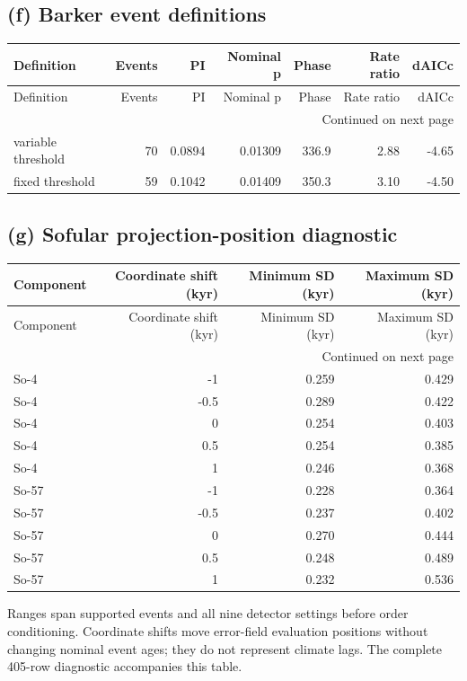\subsection*{(f) Barker event definitions}
{\small
\begin{longtable}{lrrrrrr}
\toprule
Definition & Events & PI & Nominal p & Phase & Rate ratio & dAICc \\
\midrule
\endfirsthead
\toprule
Definition & Events & PI & Nominal p & Phase & Rate ratio & dAICc \\
\midrule
\endhead
\midrule
\multicolumn{7}{r}{Continued on next page} \\
\midrule
\endfoot
\bottomrule
\endlastfoot
variable threshold & 70 & 0.0894 & 0.01309 & 336.9 & 2.88 & -4.65 \\
fixed threshold & 59 & 0.1042 & 0.01409 & 350.3 & 3.10 & -4.50 \\
\end{longtable}
}
\subsection*{(g) Sofular projection-position diagnostic}
{\small
\begin{longtable}{lrrr}
\toprule
Component & Coordinate shift (kyr) & Minimum SD (kyr) & Maximum SD (kyr) \\
\midrule
\endfirsthead
\toprule
Component & Coordinate shift (kyr) & Minimum SD (kyr) & Maximum SD (kyr) \\
\midrule
\endhead
\midrule
\multicolumn{4}{r}{Continued on next page} \\
\midrule
\endfoot
\bottomrule
\endlastfoot
So-4 & -1 & 0.259 & 0.429 \\
So-4 & -0.5 & 0.289 & 0.422 \\
So-4 & 0 & 0.254 & 0.403 \\
So-4 & 0.5 & 0.254 & 0.385 \\
So-4 & 1 & 0.246 & 0.368 \\
So-57 & -1 & 0.228 & 0.364 \\
So-57 & -0.5 & 0.237 & 0.402 \\
So-57 & 0 & 0.270 & 0.444 \\
So-57 & 0.5 & 0.248 & 0.489 \\
So-57 & 1 & 0.232 & 0.536 \\
\end{longtable}
}
Ranges span supported events and all nine detector settings before order conditioning. Coordinate shifts move error-field evaluation positions without changing nominal event ages; they do not represent climate lags. The complete 405-row diagnostic accompanies this table.
